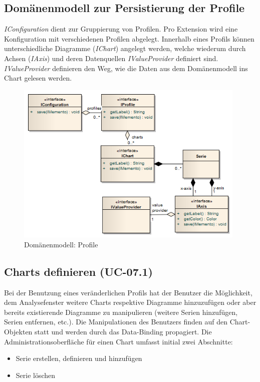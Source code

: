 \subsection{Domänenmodell zur Persistierung der Profile}
\textit{IConfiguration} dient zur Gruppierung von Profilen. Pro Extension wird eine Konfiguration mit verschiedenen Profilen abgelegt. Innerhalb eines Profils können unterschiedliche Diagramme (\textit{IChart}) angelegt werden, welche wiederum durch Achsen (\textit{IAxis}) und deren Datenquellen \textit{IValueProvider} definiert sind. \textit{IValueProvider} definieren den Weg, wie die Daten aus dem Domänenmodell ins Chart gelesen werden.
 \begin{figure}[H]
  	\centering
    	\includegraphics[width=11cm]{images/core_domain_profiles}
        	\caption{Domänenmodell: Profile}
\end{figure}

\subsection{Charts definieren (UC-07.1)}
Bei der Benutzung eines veränderlichen Profils hat der Benutzer die Möglichkeit, dem Analysefenster weitere Charts respektive Diagramme hinzuzufügen oder aber bereits existierende Diagramme zu manipulieren (weitere Serien hinzufügen, Serien entfernen, etc.). Die Manipulationen des Benutzers finden auf den Chart-Objekten statt und werden durch das Data-Binding propagiert. Die Administrationsoberfläche für einen Chart umfasst initial zwei Abschnitte:
\begin{itemize}
	\item Serie erstellen, definieren und hinzufügen
	 \item Serie löschen
\end{itemize}

